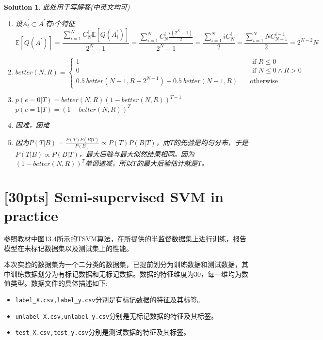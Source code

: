 \documentclass[a4paper,UTF8]{article}
\newtheorem*{solution}{Solution}
\numberwithin{equation}{section}
\begin{document}
\begin{solution}
此处用于写解答(中英文均可)
\begin{enumerate}[(1)]
    \item 设$A_i^{\prime}\subset A^{\prime}$有$i$个特征
    \[\mathbb{E}[Q(A^\prime)]=\frac{\sum_{i=1}^N C_N^i\mathbb{E}[Q(A_i^{\prime})]}{2^N-1}=\frac{\sum_{i=1}^N C_N^i \frac{i(2^N-1)}{2}}{2^N-1}=\frac{\sum_{i=1}^N i C_N^i}{2}=\frac{\sum_{i=1}^N N C_{N-1}^{i-1}}{2}=2^{N-2}N\]
    \item 
    \[better(N,R)=\begin{cases}
        1&\quad \text{ if }R\leq 0\\
        0&\quad \text{ if }N\leq 0\land R>0\\
        0.5~better(N-1,R-2^{N-1})+0.5~better(N-1,R)&\quad \text{otherwise}
    \end{cases}\]
    \item $p(e=0|T)=better(N,R)(1-better(N,R))^{T-1}$\\
    $p(e=1|T)=(1-better(N,R))^{T}$
    \item 困难，困难
    \item 因为$P(T|B)=\frac{P(T)P(B|T)}{P(B)}\propto P(T)P(B|T)$，而$T$的先验是均匀分布，于是$P(T|B)\propto P(B|T)$，最大后验与最大似然结果相同。因为$(1-better(N,R))^{T}$单调递减，所以$T$的最大后验估计就是$T$。
\end{enumerate}
\end{solution}

\section{\textbf{[30pts]} Semi-supervised SVM in practice}
参照教材中图13.4所示的TSVM算法，在所提供的半监督数据集上进行训练，报告模型在未标记数据集以及测试集上的性能。

本次实验的数据集为一个二分类的数据集，已提前划分为训练数据和测试数据，其中训练数据划分为有标记数据和无标记数据。数据的特征维度为30，每一维均为数值类型。数据文件的具体描述如下:
\begin{itemize}
    \item \texttt{label\_X.csv,label\_y.csv}分别是有标记数据的特征及其标签。
    \item \texttt{unlabel\_X.csv,unlabel\_y.csv}分别是无标记数据的特征及其标签。
    \item \texttt{test\_X.csv,test\_y.csv}分别是测试数据的特征及其标签。
\end{itemize}
\end{document}
